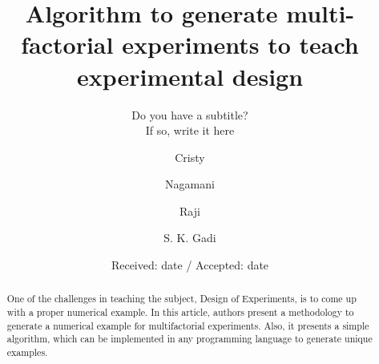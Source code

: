 \documentclass[twocolumn]{svjour3}          %
\begin{document}
\title{Algorithm to generate multi-factorial experiments to teach experimental design%
}
\subtitle{Do you have a subtitle?\\ If so, write it here}
\author{Cristy  \and
        Nagamani \and
        Raji \and
        S. K. Gadi
}
\date{Received: date / Accepted: date}
\maketitle
\begin{abstract}
One of the challenges in teaching the subject, Design of Experiments, is to come up with a proper numerical example. In this article, authors present a methodology to generate a numerical example for multifactorial experiments. Also, it presents a simple algorithm, which can be implemented in any programming language to generate unique examples.
\end{abstract}
\end{document}
